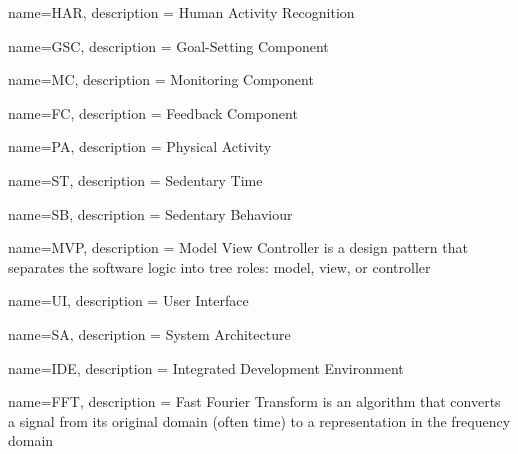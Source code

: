 
{
  name=HAR,
  description = {Human Activity Recognition}
}

{
    name=GSC,
    description = {Goal-Setting Component}
}

{
    name=MC,
    description = {Monitoring Component}
}

{
    name=FC,
    description = {Feedback Component}
}

{
    name=PA,
    description = {Physical Activity}
}

{
    name=ST,
    description = {Sedentary Time}
}

{
    name=SB,
    description = {Sedentary Behaviour}
}

{
    name=MVP,
    description = {Model View Controller is a design pattern that separates the software logic into tree roles: model, view, or controller}
}

{
    name=UI,
    description = {User Interface}
}

{
    name=SA,
    description = {System Architecture}
}

{
    name=IDE,
    description = {Integrated Development Environment}
}

{
    name=FFT,
    description = {Fast Fourier Transform is an algorithm that converts a signal from its original domain (often time) to a representation in the frequency domain}
}

\glsaddall %
\printglossaries